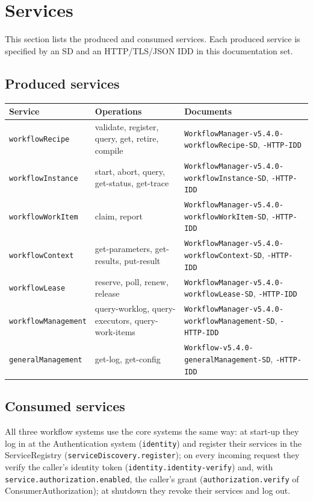 \documentclass[a4paper]{arrowhead}
\begin{document}
\newpage
\section{Services}
\label{sec:services}
This section lists the produced and consumed services. Each produced service is specified by an SD and an HTTP/TLS/JSON
IDD in this documentation set.

\subsection{Produced services}

{\small
\begin{longtable}{|p{3.8cm}|p{6.2cm}|p{5.8cm}|}

\hline
\rowcolor{gray!33} Service & Operations & Documents \\ \hline
\endhead
\texttt{workflowRecipe} & validate, register, query, get, retire, compile & \texttt{WorkflowManager-v5.4.0-workflowRecipe-SD}, \texttt{-HTTP-IDD} \\ \hline
\texttt{workflowInstance} & start, abort, query, get-status, get-trace & \texttt{WorkflowManager-v5.4.0-workflowInstance-SD}, \texttt{-HTTP-IDD} \\ \hline
\texttt{workflowWorkItem} & claim, report & \texttt{WorkflowManager-v5.4.0-workflowWorkItem-SD}, \texttt{-HTTP-IDD} \\ \hline
\texttt{workflowContext} & get-parameters, get-results, put-result & \texttt{WorkflowManager-v5.4.0-workflowContext-SD}, \texttt{-HTTP-IDD} \\ \hline
\texttt{workflowLease} & reserve, poll, renew, release & \texttt{WorkflowManager-v5.4.0-workflowLease-SD}, \texttt{-HTTP-IDD} \\ \hline
\texttt{workflowManagement} & query-worklog, query-executors, query-work-items & \texttt{WorkflowManager-v5.4.0-workflowManagement-SD}, \texttt{-HTTP-IDD} \\ \hline
\texttt{generalManagement} & get-log, get-config & \texttt{Workflow-v5.4.0-generalManagement-SD}, \texttt{-HTTP-IDD} \\ \hline
\end{longtable}
}


\subsection{Consumed services}
All three workflow systems use the core systems the same way: at start-up they log in at the Authentication
system (\texttt{identity}) and register their services in the ServiceRegistry (\texttt{serviceDiscovery.register});
on every incoming request they verify the caller's identity token (\texttt{identity.identity-verify}) and, with
\texttt{service.authorization.enabled}, the caller's grant (\texttt{authorization.verify} of ConsumerAuthorization);
at shutdown they revoke their services and log out.
\end{document}
